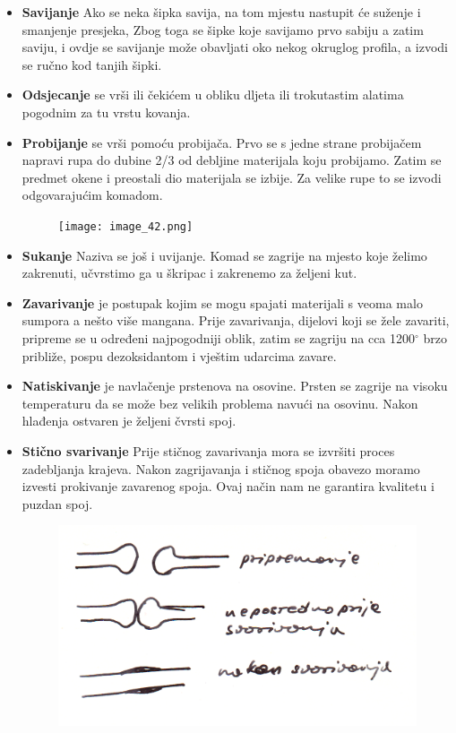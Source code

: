 \documentclass[a4paper,12pt]{article}
\numberwithin{figure}{section}
\begin{document}
\begin{itemize}
\begin{figure}[!h]
\end{figure}
\FloatBarrier
\item \textbf{Savijanje}  Ako se neka šipka savija, na tom mjestu nastupit će suženje i smanjenje presjeka, Zbog toga se šipke koje savijamo prvo sabiju a zatim saviju, i ovdje se savijanje može obavljati oko nekog okruglog profila, a izvodi se ručno kod tanjih šipki.
\item \textbf{Odsjecanje} se vrši ili čekićem u obliku dljeta ili trokutastim alatima pogodnim za tu vrstu kovanja.
\item \textbf{Probijanje} se vrši pomoću probijača. Prvo se s jedne strane probijačem napravi rupa do dubine 2/3 od debljine materijala koju probijamo. Zatim se predmet okene i preostali dio materijala se izbije. Za velike rupe to se izvodi odgovarajućim komadom.
\begin{figure}[!h]
\centering
\texttt{[image: image\_42.png]}
\end{figure}
\FloatBarrier
\item \textbf{Sukanje} Naziva se još i uvijanje. Komad se zagrije na mjesto koje želimo zakrenuti, učvrstimo ga u škripac i zakrenemo za željeni kut.
\item \textbf{Zavarivanje} je postupak kojim se mogu spajati materijali s veoma malo sumpora a nešto više mangana. Prije zavarivanja, dijelovi koji se žele zavariti, pripreme se u određeni najpogodniji oblik, zatim se zagriju na cca 1200$^{\circ}$ brzo približe, pospu dezoksidantom i vještim udarcima zavare.
\item \textbf{Natiskivanje} je navlačenje prstenova na osovine. Prsten se zagrije na visoku temperaturu da se može bez velikih problema navući na osovinu. Nakon hlađenja ostvaren je željeni čvrsti spoj.
\item \textbf{Stično svarivanje} Prije stičnog zavarivanja mora se izvršiti proces zadebljanja krajeva. Nakon zagrijavanja  i stičnog spoja obavezo moramo izvesti prokivanje zavarenog spoja. Ovaj način nam ne garantira kvalitetu i puzdan spoj.
\begin{figure}[!h]
\centering
\includegraphics[scale=0.15]{image_43-1.png}

\end{figure}
\end{itemize}
\end{document}
